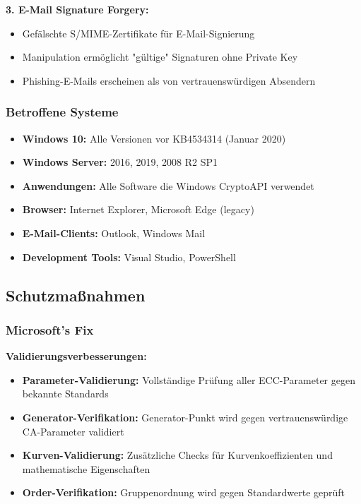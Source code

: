 \documentclass{article}
\begin{document}
\textbf{3. E-Mail Signature Forgery:}
\begin{itemize}
    \item Gefälschte S/MIME-Zertifikate für E-Mail-Signierung
    \item Manipulation ermöglicht "gültige" Signaturen ohne Private Key
    \item Phishing-E-Mails erscheinen als von vertrauenswürdigen Absendern
\end{itemize}

\subsubsection{Betroffene Systeme}

\begin{itemize}
    \item \textbf{Windows 10:} Alle Versionen vor KB4534314 (Januar 2020)
    \item \textbf{Windows Server:} 2016, 2019, 2008 R2 SP1
    \item \textbf{Anwendungen:} Alle Software die Windows CryptoAPI verwendet
    \item \textbf{Browser:} Internet Explorer, Microsoft Edge (legacy)
    \item \textbf{E-Mail-Clients:} Outlook, Windows Mail
    \item \textbf{Development Tools:} Visual Studio, PowerShell
\end{itemize}

\subsection{Schutzmaßnahmen}

\subsubsection{Microsoft's Fix}

\textbf{Validierungsverbesserungen:}
\begin{itemize}
    \item \textbf{Parameter-Validierung:} Vollständige Prüfung aller ECC-Parameter gegen bekannte Standards
    \item \textbf{Generator-Verifikation:} Generator-Punkt wird gegen vertrauenswürdige CA-Parameter validiert
    \item \textbf{Kurven-Validierung:} Zusätzliche Checks für Kurvenkoeffizienten und mathematische Eigenschaften
    \item \textbf{Order-Verifikation:} Gruppenordnung wird gegen Standardwerte geprüft
\end{itemize}
\end{document}
